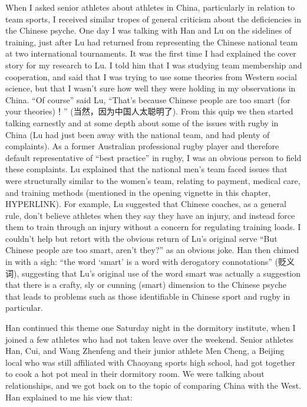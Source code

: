 \begin{CJK}{UTF8}{gbsn}
When I asked senior athletes about athletes in China, particularly in relation to team sports, I received similar tropes of general  criticism about the deficiencies in the Chinese psyche.  One day I was talking with Han and Lu on the sidelines of training, just after Lu had returned from representing the Chinese national team at two international tournaments. It was the first time I had explained the cover story for my research to Lu.  I told him that I was studying team membership and cooperation, and said that I was trying to use some theories from Western social science, but that I wasn't sure how well they were holding in my observations in China. ``Of course'' said Lu, ``That's because Chinese people are too smart (for your theories)！''  (当然，因为中国人太聪明了).  From this quip we then started talking earnestly and at some depth about some of the issues with rugby in China (Lu had just been away with the national team, and had plenty of complaints).  As a former Australian professional rugby player and therefore default representative of ``best practice'' in rugby, I was an obvious person to field these complaints. Lu explained that the national men's team faced issues that were structurally similar to the women's team, relating to payment, medical care, and training methods (mentioned in the opening vignette in this chapter, HYPERLINK).  For example, Lu suggested that Chinese coaches, as a general rule, don't believe athletes when they say they have an injury, and instead force them to train through an injury without a concern for regulating training loads. I couldn't help but retort with the obvious return of Lu's original serve ``But Chinese people are too smart, aren't they?'' as an obvious joke.  Han then chimed in with a sigh: ``the word `smart' is a word with derogatory connotations'' (贬义词), suggesting that Lu's original use of the word smart was actually a suggestion that there is a crafty, sly or cunning (smart) dimension to the Chinese psyche that leads to problems such as those identifiable in Chinese sport and rugby in particular.

Han continued this theme one Saturday night in the dormitory institute, when I joined a few athletes who had not taken leave over the weekend. Senior athletes Han, Cui, and Wang Zhenfeng and their junior athlete Men Cheng, a Beijing local who was still affiliated with Chaoyang sports high school, had got together to cook a hot pot meal in their dormitory room.  We were talking about relationships, and we got back on to the topic of comparing China with the West.  Han explained to me his view that:


\end{CJK}
